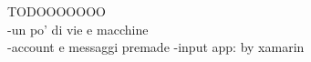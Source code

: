\begin{comment}
\noindent
\begin{tabularx}{\textwidth}{l X}
\hline
\textbf{STUBS} & \textbf{TEST SUITES}\\
\hline
Mail Server & AccountManager.Creation\\
            & AccountManager.ProfileManagement\\
\hline
Payment Processor Provider & PaymentProcessor.RequestProcessing\\
\hline
STUBNAME & TESTSUITES\\
\hline
STUBNAME & TESTSUITES\\
\hline
STUBNAME & TESTSUITES\\
\hline
STUBNAME & TESTSUITES\\
\hline
STUBNAME & TESTSUITES\\
\hline
STUBNAME & TESTSUITES\\
\hline
\end{tabularx}
\end{comment}

TODOOOOOOO\\
-un po' di vie e macchine\\
-account e messaggi premade
-input app: by xamarin
